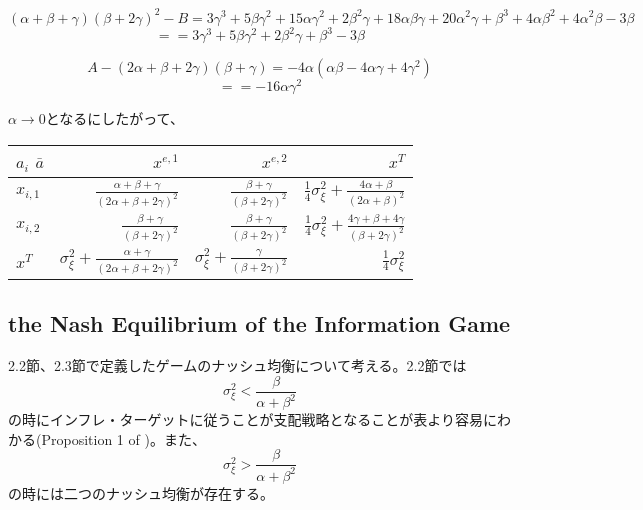 \documentclass{jsarticle}
\begin{document}
$$ (\alpha + \beta + \gamma)(\beta + 2\gamma)^2 - B = 3\gamma^3+5\beta\gamma^2+15\alpha\gamma^2+2\beta^2\gamma+18\alpha\beta\gamma+20\alpha^2\gamma+\beta^3+4 \alpha\beta^2+4\alpha^2\beta-3\beta$$
$$ == 3\gamma^3+5\beta\gamma^2+2\beta^2\gamma+\beta^3-3\beta $$


$$A - (2\alpha + \beta + 2\gamma)(\beta + \gamma) = -4\alpha(\alpha\beta-4\alpha\gamma+4\gamma^2)$$
$$ == -16\alpha\gamma^2 $$




$\alpha \rightarrow 0$となるにしたがって、


\begin{table}
\begin{center}
  \begin{tabular}{|l||r|r|r|} \hline
    $a_{i}$ $\bar{a}$&  $x^{e, 1}$ & $x^{e, 2}$ & $x^{T}$ \\ \hline \hline
    
    $x_{i, 1}$ & $\frac{\alpha + \beta + \gamma}{(2\alpha + \beta + 2\gamma)^{2}}$ & $\frac{\beta + \gamma}{(\beta + 2\gamma)^2}$ & $\frac{1}{4}\sigma^{2}_{\xi} + \frac{4\alpha + \beta}{(2\alpha + \beta)^{2}}$\\
    
    $x_{i, 2}$ & $\frac{\beta + \gamma}{(\beta + 2\gamma)^2}$ & $\frac{\beta + \gamma}{(\beta + 2\gamma)^{2}}$ & $\frac{1}{4}\sigma^{2}_{\xi} + \frac{4\gamma + \beta + 4\gamma}{(\beta + 2\gamma)^{2}}$\\ 
    $x^{T}$ & $\sigma^{2}_{\xi} + \frac{\alpha + \gamma}{(2\alpha + \beta + 2\gamma)^{2}}$ & $\sigma^{2}_{\xi} + \frac{\gamma }{(\beta + 2\gamma)^{2}}$ & $\frac{1}{4}\sigma^{2}_{\xi}$ \\ \hline
    
  \end{tabular}
  \end{center}
 
\end{table}


\subsection{the Nash Equilibrium of the Information Game}
2.2節、2.3節で定義したゲームのナッシュ均衡について考える。2.2節では
$$\sigma^2_{\xi} < \frac{\beta}{\alpha + \beta^2}$$
の時にインフレ・ターゲットに従うことが支配戦略となることが表より容易にわかる(Proposition 1 of )。また、
$$\sigma^2_{\xi} > \frac{\beta}{\alpha + \beta^2}$$
の時には二つのナッシュ均衡が存在する。
\end{document}
